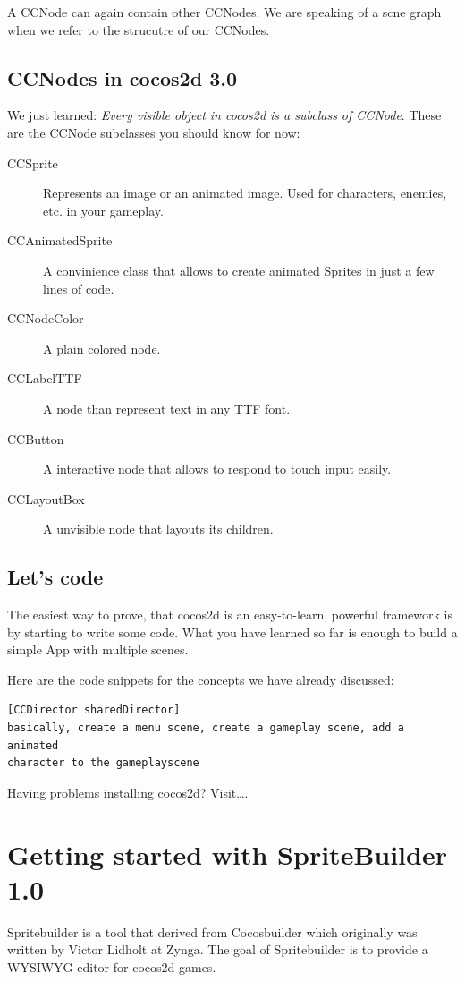 \documentclass{scrreprt}
\newcommand{\cocos}{cocos2d}
\newcommand{\spriteb}{SpriteBuilder}
\newcounter{error}[chapter]
\begin{document}
A CCNode can again contain other CCNodes. We are speaking of a scne graph when
we refer to the strucutre of our CCNodes.

\section{CCNodes in \cocos{} 3.0}
We just learned: \textit{Every visible object in \cocos{} is a subclass of
CCNode}. These are the CCNode subclasses you should know for now:

\begin{description}
  \item[CCSprite] Represents an image or an animated image. Used for characters,
  enemies, etc. in your gameplay.
  \item[CCAnimatedSprite] A convinience class that allows to create animated
  Sprites in just a few lines of code.
  \item[CCNodeColor] A plain colored node.
  \item[CCLabelTTF] A node than represent text in any TTF font.
  \item[CCButton] A interactive node that allows to respond to touch input
  easily.
  \item[CCLayoutBox] A unvisible node that layouts its children.
\end{description}

\section{Let's code}
The easiest way to prove, that \cocos{} is an easy-to-learn, powerful framework
is by starting to write some code. What you have learned so far is enough to
build a simple App with multiple scenes.

Here are the code snippets for the concepts we have already discussed:
\begin{lstlisting}[title=examples/introduction.clj]
[CCDirector sharedDirector]
basically, create a menu scene, create a gameplay scene, add a animated
character to the gameplayscene
\end{lstlisting} 


\begin{error}
Having problems installing \cocos{}? Visit\ldots.
\end{error}

\chapter{Getting started with \spriteb{} 1.0}
Spritebuilder is a tool that derived from Cocosbuilder which originally was
written by Victor Lidholt at Zynga. The goal of Spritebuilder is to provide a
WYSIWYG editor for \cocos{} games. 
\end{document}
